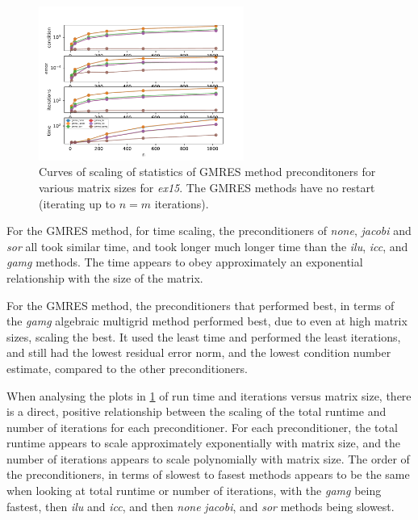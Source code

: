 \documentclass[12pt,letterpaper]{article}
\newcommand{\program}{\textit{ex15}}
\begin{document}
\begin{figure}[ht]
  \centering
  \includegraphics[width=0.6\textwidth,trim={0 0 0 0cm},clip]{results_gmres.pdf}
  \caption{Curves of scaling of statistics of GMRES method preconditoners for various matrix sizes for \program. The GMRES methods have no restart (iterating up to $n=m$ iterations).}
  \label{fig:Ex3a_gmres}
\end{figure}

For the GMRES method, for time scaling, the preconditioners of \textit{none}, \textit{jacobi} and \textit{sor} all took similar time, and took longer much longer time than the \textit{ilu}, \textit{icc}, and \textit{gamg} methods. The time appears to obey approximately an exponential relationship with the size of the matrix.


For the GMRES method, the preconditioners that performed best, in terms of the \textit{gamg} algebraic multigrid method performed best, due to even at high matrix sizes, scaling the best. It used the least time and performed the least iterations, and still had the lowest residual error norm, and the lowest condition number estimate, compared to the other preconditioners.

When analysing the plots in \ref{fig:Ex3a_gmres} of run time and iterations versus matrix size, there is a direct, positive relationship between the scaling of the total runtime and number of iterations for each preconditioner. For each preconditioner, the total runtime appears to scale approximately exponentially with matrix size, and the number of iterations appears to scale polynomially with matrix size. The order of the preconditioners, in terms of slowest to fasest methods appears to be the same when looking at total runtime or number of iterations, with the \textit{gamg} being fastest, then \textit{ilu} and \textit{icc}, and then \textit{none} \textit{jacobi}, and \textit{sor} methods being slowest.
\end{document}
